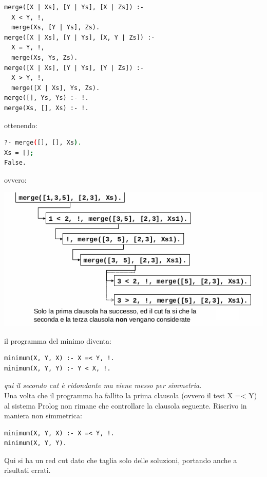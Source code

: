 \documentclass[a4paper,12pt, oneside]{book}
\begin{document}
\begin{verbatim}
merge([X | Xs], [Y | Ys], [X | Zs]) :-
  X < Y, !,
  merge(Xs, [Y | Ys], Zs).
merge([X | Xs], [Y | Ys], [X, Y | Zs]) :-
  X = Y, !,
  merge(Xs, Ys, Zs).
merge([X | Xs], [Y | Ys], [Y | Zs]) :-
  X > Y, !,
  merge([X | Xs], Ys, Zs).
merge([], Ys, Ys) :- !.
merge(Xs, [], Xs) :- !.
\end{verbatim}
ottenendo:
\begin{shaded}
	\begin{lstlisting}[language=bash]
?- merge([], [], Xs).
Xs = [];
False.
\end{lstlisting}
\end{shaded}
ovvero:
\begin{center}
	\includegraphics[scale=0.8]{img/cut3.png}
\end{center}
il programma del minimo diventa:
\begin{verbatim}
minimum(X, Y, X) :- X =< Y, !.
minimum(X, Y, Y) :- Y < X, !.
\end{verbatim}
\textit{qui il secondo cut è ridondante ma viene messo per simmetria}.\\
Una volta che il programma ha fallito la prima clausola (ovvero il
test X =< Y) al sistema Prolog non rimane che controllare la
clausola seguente. Riscrivo in maniera non simmetrica:
\begin{verbatim}
minimum(X, Y, X) :- X =< Y, !.
minimum(X, Y, Y).
\end{verbatim}
Qui si ha un red cut dato che taglia solo delle soluzioni, portando anche a risultati errati.\\
\end{document}
